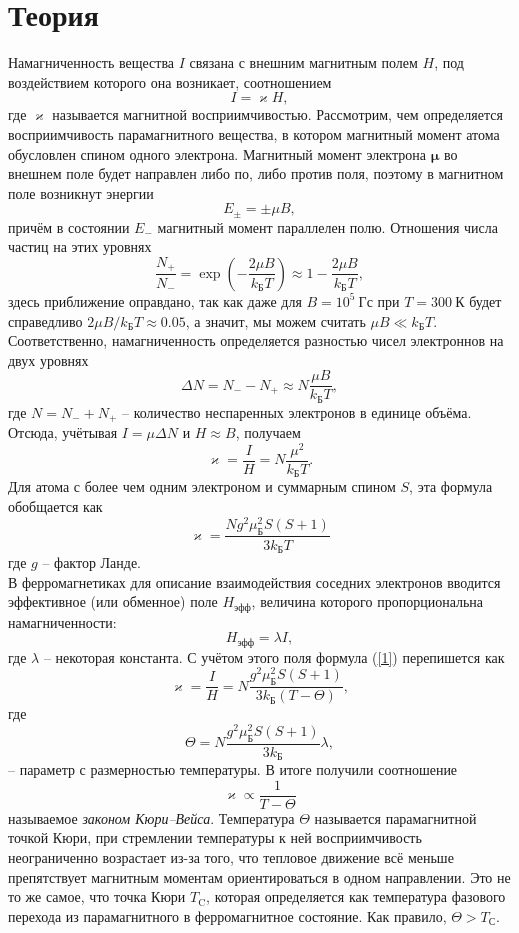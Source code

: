\documentclass[a4paper,12pt]{article}
\theoremstyle{definition}
\begin{document}
\section*{Теория}
Намагниченность вещества $I$ связана с внешним магнитным полем $H$, под воздействием которого она возникает, соотношением 
\[
I = \varkappa H,
\]
где $\varkappa$ называется магнитной восприимчивостью. Рассмотрим, чем определяется восприимчивость парамагнитного вещества, в котором магнитный момент атома обусловлен спином одного электрона. Магнитный момент электрона $\boldsymbol{\mu}$ во внешнем поле будет направлен либо по, либо против поля, поэтому в магнитном поле возникнут энергии
\[
E_{\pm} = \pm\mu B,
\]
причём в состоянии $E_-$ магнитный момент параллелен полю. Отношения числа частиц на этих уровнях
\[
\dfrac{N_+}{N_-} = \exp\left(- \dfrac{2\mu B}{k_{\text{Б}}T} \right) \approx 1 - \dfrac{2\mu B}{k_{\text{Б}}T},
\]
здесь приближение оправдано, так как даже для $B = 10^5~\text{Гс}$ при $T = 300~\text{К}$ будет справедливо $2\mu B/k_{\text{Б}}T \approx 0.05$, а значит, мы можем считать $\mu B \ll k_{\text{Б}}T$. Соответственно, намагниченность определяется разностью чисел электроннов на двух уровнях
\[
\Delta N = N_- - N_+ \approx N \dfrac{\mu B}{k_{\text{Б}}T},
\]
где $N = N_- + N_+$ -- количество неспаренных электронов в единице объёма. Отсюда, учётывая $I = \mu \Delta N$ и $H \approx B$, получаем
\begin{equation}\label{1}
\varkappa = \dfrac{I}{H} = N\dfrac{\mu^2}{k_{\text{Б}}T}.
\end{equation}
Для атома с более чем одним электроном и суммарным спином $S$, эта формула обобщается как
\[
\varkappa = \dfrac{Ng^2 \mu_{\text{Б}}^2S(S+1)}{3k_{\text{Б}}T}
\]
где $g$ -- фактор Ланде.\\
В ферромагнетиках для описание взаимодействия соседних электронов вводится эффективное (или обменное) поле $H_{\text{эфф}}$, величина которого пропорциональна намагниченности:
\[
H_{\text{эфф}} = \lambda I,
\]
где $\lambda$ -- некоторая константа. С учётом этого поля формула (\ref{1}) перепишется как
\[
\varkappa = \dfrac{I}{H} = N\dfrac{g^2 \mu_{\text{Б}}^2 S(S+1)}{3k_{\text{Б}}(T-\Theta)},
\]
где 
\[
\Theta = N \dfrac{g^2 \mu_{\text{Б}}^2 S(S+1)}{3k_{\text{Б}}}\lambda,
\]
-- параметр с размерностью температуры. В итоге получили соотношение
\begin{equation}
\boxed{\varkappa \propto \dfrac{1}{T - \Theta}}
\end{equation}
называемое \textit{законом Кюри--Вейса}. Температура $\Theta$ называется парамагнитной точкой Кюри, при стремлении температуры к ней восприимчивость неограниченно возрастает из-за того, что тепловое движение всё меньше препятствует магнитным моментам ориентироваться в одном направлении. Это не то же самое, что точка Кюри $T_\text{C}$, которая определяется как температура фазового перехода из парамагнитного в ферромагнитное состояние. Как правило, $\Theta > T_\text{С}$.\\
\end{document}
